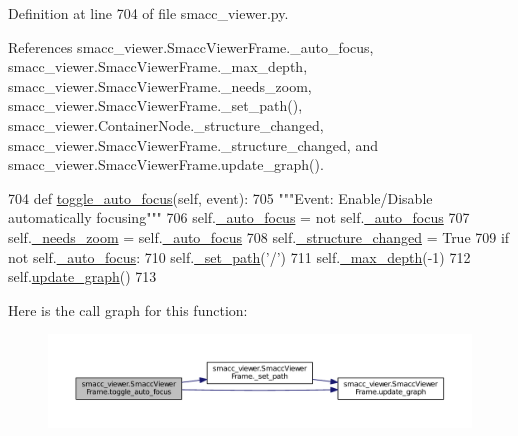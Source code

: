Definition at line 704 of file smacc\+\_\+viewer.\+py.



References smacc\+\_\+viewer.\+Smacc\+Viewer\+Frame.\+\_\+auto\+\_\+focus, smacc\+\_\+viewer.\+Smacc\+Viewer\+Frame.\+\_\+max\+\_\+depth, smacc\+\_\+viewer.\+Smacc\+Viewer\+Frame.\+\_\+needs\+\_\+zoom, smacc\+\_\+viewer.\+Smacc\+Viewer\+Frame.\+\_\+set\+\_\+path(), smacc\+\_\+viewer.\+Container\+Node.\+\_\+structure\+\_\+changed, smacc\+\_\+viewer.\+Smacc\+Viewer\+Frame.\+\_\+structure\+\_\+changed, and smacc\+\_\+viewer.\+Smacc\+Viewer\+Frame.\+update\+\_\+graph().


\begin{DoxyCode}
704     \textcolor{keyword}{def }\hyperlink{classsmacc__viewer_1_1SmaccViewerFrame_a6ca9f14ae1b5d6f1ebac05575536255b}{toggle\_auto\_focus}(self, event):
705         \textcolor{stringliteral}{"""Event: Enable/Disable automatically focusing"""}
706         self.\hyperlink{classsmacc__viewer_1_1SmaccViewerFrame_a733f65cc99ce9d6effae5c6a87be4989}{\_auto\_focus} = \textcolor{keywordflow}{not} self.\hyperlink{classsmacc__viewer_1_1SmaccViewerFrame_a733f65cc99ce9d6effae5c6a87be4989}{\_auto\_focus}
707         self.\hyperlink{classsmacc__viewer_1_1SmaccViewerFrame_a2307d88cbcee116cf8a6fa2201aedc44}{\_needs\_zoom} = self.\hyperlink{classsmacc__viewer_1_1SmaccViewerFrame_a733f65cc99ce9d6effae5c6a87be4989}{\_auto\_focus}
708         self.\hyperlink{classsmacc__viewer_1_1SmaccViewerFrame_aa5d9c77b0c46dfb7d5258d1efbcc74b0}{\_structure\_changed} = \textcolor{keyword}{True}
709         \textcolor{keywordflow}{if} \textcolor{keywordflow}{not} self.\hyperlink{classsmacc__viewer_1_1SmaccViewerFrame_a733f65cc99ce9d6effae5c6a87be4989}{\_auto\_focus}:
710             self.\hyperlink{classsmacc__viewer_1_1SmaccViewerFrame_a7263344a2979e9d989f0142a15d1b1f2}{\_set\_path}(\textcolor{stringliteral}{'/'})
711             self.\hyperlink{classsmacc__viewer_1_1SmaccViewerFrame_acf8a98a2a2d4ae1f21e0fc3cd020b89a}{\_max\_depth}(-1)
712         self.\hyperlink{classsmacc__viewer_1_1SmaccViewerFrame_a3dbf56a66153e99b403fe731ea8a6759}{update\_graph}()
713 
\end{DoxyCode}


Here is the call graph for this function\+:
\nopagebreak
\begin{figure}[H]
\begin{center}
\leavevmode
\includegraphics[width=350pt]{classsmacc__viewer_1_1SmaccViewerFrame_a6ca9f14ae1b5d6f1ebac05575536255b_cgraph}
\end{center}
\end{figure}


